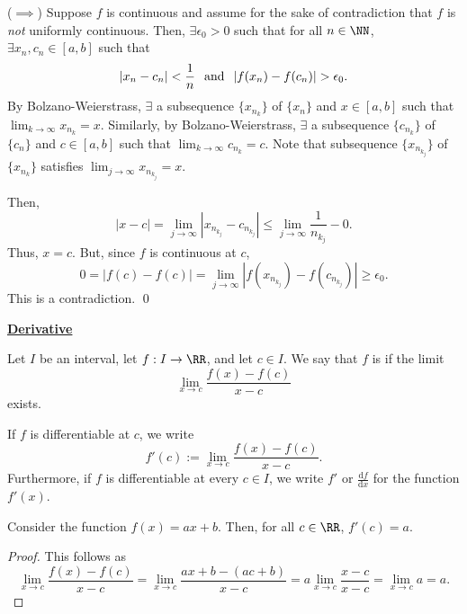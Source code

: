 ($\implies$) Suppose $f$ is continuous and assume for the sake of contradiction that $f$ is \textit{not} uniformly continuous. Then, $\exists \epsilon_0>0$ such that for all $n\in \NN$, $\exists x_n,c_n\in [a,b]$ such that 
\[
|x_n-c_n| < \frac{1}{n} \hspace{.25cm} \text{and} \hspace{.25cm} |f(x_n) - f(c_n)| >\epsilon_0.
\]
By Bolzano-Weierstrass, $\exists$ a subsequence $\{x_{n_k}\}$ of $\{x_n\}$ and $x\in [a,b]$ such that $\lim_{k\to \infty} x_{n_k} = x$. Similarly, by Bolzano-Weierstrass, $\exists$ a subsequence $\{c_{n_k}\}$ of $\{c_n\}$ and $c\in [a,b]$ such that $\lim_{k\to \infty} c_{n_k} = c$. Note that subsequence $\{x_{n_{k_j}}\}$ of $\{x_{n_k}\}$ satisfies $\lim_{j\to \infty} x_{n_{k_j}} = x$.

Then, 
\[
|x-c| = \lim_{j\to \infty} |x_{n_{k_j}} - c_{n_{k_j}}| \leq \lim_{j\to \infty} \frac{1}{n_{k_j}} - 0.
\]
Thus, $x=c$. But, since $f$ is continuous at $c$,
\[
0 = |f(c)-f(c)| = \lim_{j\to \infty} |f(x_{n_{k_j}}) - f(c_{n_{k_j}})| \geq \epsilon_0.
\]
This is a contradiction. \qed 

\noindent\underline{\textbf{Derivative}}
\begin{definition}
Let $I$ be an interval, let $f:I \to \RR$, and let $c\in I$. We say that $f$ is  if the limit 
\[
\lim_{x\to c} \frac{f(x)-f(c)}{x-c}
\]
exists.
\end{definition}
\begin{notation}
If $f$ is differentiable at $c$, we write 
\[
f'(c) := \lim_{x\to c} \frac{f(x) - f(c)}{x-c}.
\]
Furthermore, if $f$ is differentiable at every $c\in I$, we write $f'$ or $\frac{\mathrm df}{\mathrm dx}$ for the function $f'(x)$.
\end{notation}

\begin{example}
Consider the function $f(x) = ax+b$. Then, for all $c\in \RR$, $f'(c) = a$.
\end{example}
\begin{proof}
This follows as
\[
\lim_{x\to c} \frac{f(x)-f(c)}{x-c} = \lim_{x\to c} \frac{ax+b-(ac+b)}{x-c} = a \lim_{x\to c} \frac{x-c}{x-c} = \lim_{x\to c}a = a.
\]
\end{proof}

